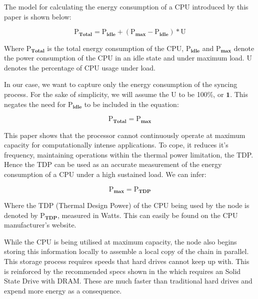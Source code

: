 The model for calculating the energy consumption of a CPU introduced by this paper \cite{SaingreUnderstandingContracts} is shown below:

\begin{equation*}
    \boldsymbol{\mathrm{P}_{Total} = \mathrm{P}_{idle} + \left({\mathrm{P}_{max} - \mathrm{P}_{idle}}\right) * \mathrm{U}}
\end{equation*}

Where $\boldsymbol{\mathrm{P}_{Total}}$ is the total energy consumption of the CPU, $\boldsymbol{\mathrm{P}_{idle}}$ and $\boldsymbol{\mathrm{P}_{max}}$ denote the power consumption of the CPU in an idle state and under maximum load. $\boldsymbol{\mathrm{U}}$ denotes the percentage of CPU usage under load.

In our case, we want to capture only the energy consumption of the syncing process. For the sake of simplicity, we will assume the $\boldsymbol{\mathrm{U}}$ to be 100\%, or $\boldsymbol{1}$. This negates the need for $\boldsymbol{\mathrm{P}_{idle}}$ to be included in the equation:

\begin{equation*}
    \boldsymbol{\mathrm{P}_{Total} = {\mathrm{P}_{max}}}
\end{equation*}

This paper \cite{Schuchart2016TheScale} shows that the processor cannot continuously operate at maximum capacity for computationally intense applications. To cope, it reduces it's frequency, maintaining operations within the thermal power limitation, the TDP. Hence the TDP can be used as an accurate measurement of the energy consumption of a CPU under a high sustained load. We can infer: \label{TDPReasoning}

\begin{equation*}
    \boldsymbol{\mathrm{P}_{max} = {\mathrm{P}_{TDP}}}
\end{equation*}

Where the TDP (Thermal Design Power) of the CPU being used by the node is denoted by $\boldsymbol{\mathrm{P}_{TDP}}$, measured in Watts. This can easily be found on the CPU manufacturer's website.

While the CPU is being utilised at maximum capacity, the node also begins storing this information locally to assemble a local copy of the chain in parallel. This storage process requires speeds that hard drives cannot keep up with. This is reinforced by the recommended specs shown in the  which requires an Solid State Drive with DRAM. These are much faster than traditional hard drives and expend more energy as a consequence. 

